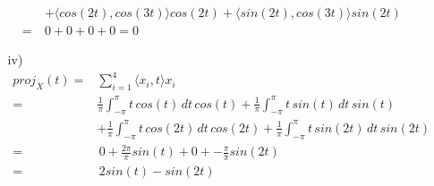 \documentclass[letterpaper,12pt]{article}
\theoremstyle{definition}
\begin{document}
\begin{enumerate}
\begin{itemize}
\begin{align*}
\quad & + \langle cos(2t), cos(3t)\rangle cos(2t) + \langle sin(2t), cos(3t)\rangle sin(2t) \\
=& 0 + 0 +0 +0 = 0
\end{align*}
\item[iv)]
\begin{align*}
proj_X(t)=& \sum_{i=1}^4 \langle x_i, t \rangle x_i\\
 =& \frac{1}{\pi}\int_{-\pi}^{\pi} t\, cos(t)\, dt\, cos(t) +\frac{1}{\pi} \int_{-\pi}^{\pi} t\, sin(t)\, dt \,sin(t) \\
 \quad &+ \frac{1}{\pi}\int_{-\pi}^{\pi} t \,cos(2t)\, dt\, cos(2t)  + \frac{1}{\pi}\int_{-\pi}^{\pi} t\, sin(2t)\, dt\, sin(2t) \\
 =& \, 0 + \frac{2\pi}{\pi} sin(t) + 0 + -\frac{\pi}{\pi} sin(2t)\\
 =&\, 2sin(t)-sin(2t)
\end{align*}
\end{itemize}
\end{enumerate}
\end{document}
